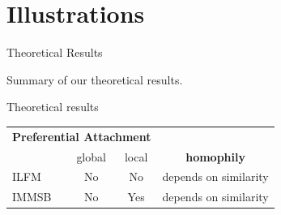 \section{Illustrations}

\begin{frame}[c]{Theoretical Results}

    Summary of our theoretical results. %
    \vspace{1cm}


    \begin{block}{Theoretical results}
	\begin{tabular}{l|cc|c}

        \multicolumn{3}{c}{\hspace{1.3cm}\textbf{Preferential Attachment}}   \\
        \cmidrule(l){2-3} 
        &   global & local  &   \textbf{homophily}      \\
        \hline
        ILFM       & \cellcolor{red!25}No & \cellcolor{red!25}No   & depends on similarity  \\
        IMMSB       & \cellcolor{red!25}No & \cellcolor{green!25}Yes  & depends on similarity \\
    \end{tabular}

    \end{block}

\end{frame}

